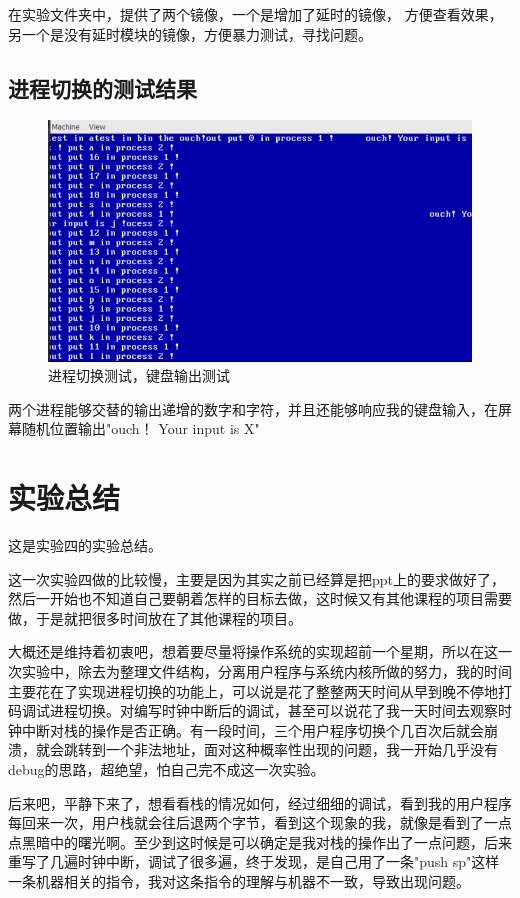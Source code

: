 \documentclass[forprint]{WHUBachelor}
\begin{document}
在实验文件夹中，提供了两个镜像，一个是增加了延时的镜像， 方便查看效果，另一个是没有延时模块的镜像，方便暴力测试，寻找问题。

\section{进程切换的测试结果}

\begin{figure}[htp]
  \centering
  \includegraphics[width=13cm]{"./figure/2018-04-17-11-14-31.png"}
  \caption{进程切换测试，键盘输出测试}
  \label{fig:main-screen}
\end{figure}

两个进程能够交替的输出递增的数字和字符，并且还能够响应我的键盘输入，在屏幕随机位置输出"ouch！ Your input is X"

\chapter{实验总结}

这是实验四的实验总结。

这一次实验四做的比较慢，主要是因为其实之前已经算是把ppt上的要求做好了，然后一开始也不知道自己要朝着怎样的目标去做，这时候又有其他课程的项目需要做，于是就把很多时间放在了其他课程的项目。

大概还是维持着初衷吧，想着要尽量将操作系统的实现超前一个星期，所以在这一次实验中，除去为整理文件结构，分离用户程序与系统内核所做的努力，我的时间主要花在了实现进程切换的功能上，可以说是花了整整两天时间从早到晚不停地打码调试进程切换。对编写时钟中断后的调试，甚至可以说花了我一天时间去观察时钟中断对栈的操作是否正确。有一段时间，三个用户程序切换个几百次后就会崩溃，就会跳转到一个非法地址，面对这种概率性出现的问题，我一开始几乎没有debug的思路，超绝望，怕自己完不成这一次实验。

后来吧，平静下来了，想看看栈的情况如何，经过细细的调试，看到我的用户程序每回来一次，用户栈就会往后退两个字节，看到这个现象的我，就像是看到了一点点黑暗中的曙光啊。至少到这时候是可以确定是我对栈的操作出了一点问题，后来重写了几遍时钟中断，调试了很多遍，终于发现，是自己用了一条"push sp"这样一条机器相关的指令，我对这条指令的理解与机器不一致，导致出现问题。
\end{document}
